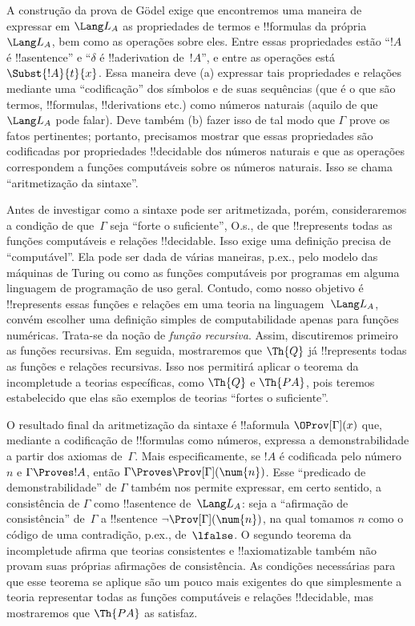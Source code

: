 \documentclass[../../../include/open-logic-section]{subfiles}
\begin{document}
A construção da prova de G\"odel exige que encontremos uma maneira de
expressar em $\Lang L_A$ as propriedades de termos e !!{formula}s da
própria $\Lang L_A$, bem como as operações sobre eles. Entre essas
propriedades estão ``$!A$ é !!a{sentence}'' e ``$\delta$ é
!!a{derivation} de~$!A$'', e entre as operações está
$\Subst{!A}{t}{x}$. Essa maneira deve (a) expressar tais propriedades e
relações mediante uma ``codificação'' dos símbolos e de suas sequências
(que é o que são termos, !!{formula}s, !!{derivation}s etc.) como
números naturais (aquilo de que $\Lang L_A$ pode falar). Deve também
(b) fazer isso de tal modo que $\Gamma$ prove os fatos pertinentes;
portanto, precisamos mostrar que essas propriedades são codificadas por
propriedades !!{decidable} dos números naturais e que as operações
correspondem a funções computáveis sobre os números naturais. Isso se
chama ``aritmetização da sintaxe''.

Antes de investigar como a sintaxe pode ser aritmetizada, porém,
consideraremos a condição de que~$\Gamma$ seja ``forte o suficiente'',
O.s.\@, de que !!{represents} todas as funções computáveis e relações
!!{decidable}. Isso exige uma definição precisa de ``computável''. Ela
pode ser dada de várias maneiras, p.ex., pelo modelo das máquinas
de Turing ou como as funções computáveis por programas em alguma
linguagem de programação de uso geral. Contudo, como nosso objetivo é
!!{represents} essas funções e relações em uma teoria na
linguagem~$\Lang L_A$, convém escolher uma definição simples de
computabilidade apenas para funções numéricas. Trata-se da noção de
\emph{função recursiva}. Assim, discutiremos primeiro as funções
recursivas. Em seguida, mostraremos que $\Th{Q}$ já !!{represents}
todas as funções e relações recursivas. Isso nos permitirá aplicar o
teorema da incompletude a teorias específicas, como $\Th{Q}$ e
$\Th{PA}$, pois teremos estabelecido que elas são exemplos de teorias
``fortes o suficiente''.

O resultado final da aritmetização da sintaxe é !!a{formula}
$\OProv[\Gamma](x)$ que, mediante a codificação de !!{formula}s como
números, expressa a demonstrabilidade a partir dos axiomas
de~$\Gamma$. Mais especificamente, se $!A$ é codificada pelo
número~$n$ e $\Gamma \Proves !A$, então
$\Gamma \Proves \Prov[\Gamma](\num{n})$. Esse ``predicado de
demonstrabilidade'' de $\Gamma$ também nos permite expressar, em certo
sentido, a consistência de $\Gamma$ como !!a{sentence} de~$\Lang L_A$:
seja a ``afirmação de consistência'' de~$\Gamma$ a !!{sentence}
$\lnot \Prov[\Gamma](\num{n})$, na qual tomamos $n$ como o código de
uma contradição, p.ex., de~$\lfalse$. O segundo teorema da
incompletude afirma que teorias consistentes e !!{axiomatizable}
também não provam suas próprias afirmações de consistência. As
condições necessárias para que esse teorema se aplique são um pouco
mais exigentes do que simplesmente a teoria representar todas as
funções computáveis e relações !!{decidable}, mas mostraremos que
$\Th{PA}$ as satisfaz.
\end{document}
